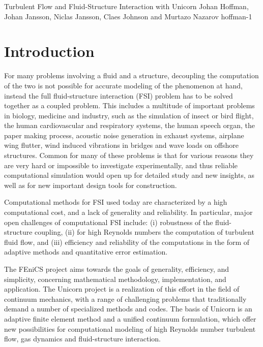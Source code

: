               {Turbulent Flow and Fluid-Structure Interaction with Unicorn}
              {Johan Hoffman, Johan Jansson, Niclas Jansson, Claes Johnson and Murtazo Nazarov}
              {hoffman-1}

\section{Introduction}

For many problems involving a fluid and a structure, decoupling the
computation of the two is not possible for accurate modeling of the
phenomenon at hand, instead the full fluid-structure interaction (FSI)
problem has to be solved together as a coupled problem. This includes
a multitude of important problems in biology, medicine and industry,
such as the simulation of insect or bird flight, the human
cardiovascular and respiratory systems, the human speech organ, the
paper making process, acoustic noise generation in exhaust systems,
airplane wing flutter, wind induced vibrations in bridges and wave
loads on offshore structures. Common for many of these problems is
that for various reasons they are very hard or impossible to
investigate experimentally, and thus reliable computational simulation
would open up for detailed study and new insights, as well as for new
important design tools for construction.

Computational methods for FSI used today are characterized by a high
computational cost, and a lack of generality and reliability. In
particular, major open challenges of computational FSI include: (i)
robustness of the fluid- structure coupling, (ii) for high Reynolds
numbers the computation of turbulent fluid flow, and (iii) efficiency
and reliability of the computations in the form of adaptive methods
and quantitative error estimation.

The FEniCS project aims towards the goals of generality, efficiency,
and simplicity, concerning mathematical methodology, implementation,
and application.  The Unicorn project is a realization of this effort
in the field of continuum mechanics, with a range of challenging
problems that traditionally demand a number of specialized methods and
codes.  The basis of Unicorn is an adaptive finite element method and
a unified continuum formulation, which offer new possibilities for
computational modeling of high Reynolds number turbulent flow, gas
dynamics and fluid-structure interaction.

